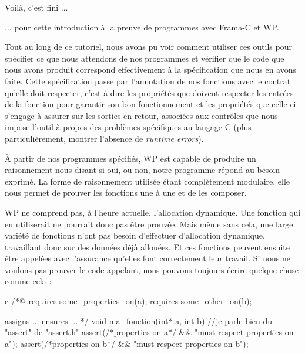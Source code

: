 \begin{Quotation}
Voilà, c'est fini ...
\end{Quotation}



... pour cette introduction à la preuve de programmes avec Frama-C et WP.



Tout au long de ce tutoriel, nous avons pu voir comment utiliser ces outils
pour spécifier ce que nous attendons de nos programmes et vérifier que le code que
nous avons produit correspond effectivement à la spécification que nous en 
avons faite. Cette spécification passe par l'annotation de nos fonctions avec 
le contrat qu'elle doit respecter, c'est-à-dire les propriétés que doivent
respecter les entrées de la fonction pour garantir son bon fonctionnement et 
les propriétés que celle-ci s'engage à assurer sur les sorties en retour,
associées aux contrôles que nous impose l'outil à propos des problèmes
spécifiques au langage C (plus particulièrement, montrer l'absence de
\textit{runtime errors}).



À partir de nos programmes spécifiés, WP est capable de produire un 
raisonnement nous disant si oui, ou non, notre programme répond au besoin 
exprimé. La forme de raisonnement utilisée étant complètement modulaire, elle 
nous permet de prouver les fonctions une à une et de les composer.

WP ne  comprend pas, à l'heure actuelle, l'allocation dynamique. Une fonction
qui en  utiliserait ne pourrait donc pas être prouvée. Mais même sans cela,
une large variété de fonctions n'ont pas besoin 
d'effectuer d'allocation dynamique, travaillant donc sur des données déjà 
allouées. Et ces fonctions peuvent ensuite être appelées avec l'assurance 
qu'elles font correctement leur travail. Si nous ne voulons pas prouver le 
code appelant, nous pouvons toujours écrire quelque chose comme cela :



\begin{CodeBlock}{c}
/*@
  requires some_properties_on(a);
  requires some_other_on(b);

  assigns ...
  ensures ...
*/
void ma_fonction(int* a, int b){
  //je parle bien du "assert" de "assert.h"
  assert(/*properties on a*/ && "must respect properties on a");  
  assert(/*properties on b*/ && "must respect properties on b");
}
\end{CodeBlock}



